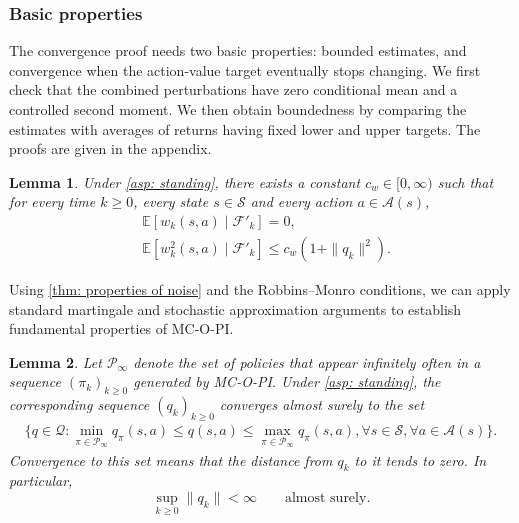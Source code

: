 \documentclass[twoside,11pt]{article}
\newtheorem{lemma}[lemma]{Lemma}
\newcommand{\qset}{\mathcal{Q}}
\newcommand{\aset}{\mathcal{A}}
\newcommand{\sset}{\mathcal{S}}
\newcommand{\polset}{\mathcal{P}}
\DeclareRobustCommand{\reviewbarstart}{%
  \ifhmode %
    \vadjust{\vbox to 0pt{%
      \vskip-\ht\strutbox %
      \vskip-\dp\strutbox %
      \cbstart[\changebarwidth] %
      \vss %
    }}%
  \else %
    \cbstart[\changebarwidth]%
  \fi %
} %
\providecommand{\DIFadd}[1]{#1} %
\providecommand{\DIFaddbegin}{\reviewbarstart} %
\providecommand{\DIFaddend}{\protect\cbend} %
\def\DIFadd#1{#1}%
\def\DIFaddbegin{}%
\def\DIFaddend{}%
\begin{document}
 \subsubsection{Basic properties}
 \DIFaddbegin \label{sec: replacement foundations}
\DIFadd{The convergence proof needs two basic properties: bounded estimates, and convergence when the action-value target eventually stops changing.
We first check that the combined perturbations have zero conditional mean and a controlled }\DIFaddend second moment. \DIFaddbegin \DIFadd{We then obtain boundedness by comparing the estimates with averages of returns having fixed lower and upper targets. The proofs are given in the appendix.
}\DIFaddend 

\begin{lemma}
\label{thm: properties of noise}
 \DIFaddbegin \DIFadd{Under \autoref{asp: standing}, there }\DIFaddend exists a constant $c_w \in [0, \infty)$
such that for every time $k \ge 0$, every state $s \in \sset$ and every action $a \in \aset(s)$,
 \DIFaddbegin \begin{align}
\DIFadd{\label{eq: muw_mds}
}&\DIFadd{\mathbb E\!\left[w_k(s,a) \mid \mathcal F'_k\right] = 0,
}\\
\DIFadd{\label{eq: muw_second_moment}
}&\DIFadd{\mathbb E\!\left[w_k^2(s,a) \mid \mathcal F'_k\right]
\le c_w(1+\|q_k\|^2) .
}\end{align}\DIFaddend 
\end{lemma}

Using \autoref{thm: properties of noise} and the Robbins--Monro conditions,
we can apply standard martingale and stochastic approximation arguments to establish fundamental properties of MC-O-PI.

 \begin{lemma}
\label{thm: bounded limit sets}
Let $\polset_\infty$ denote the set of policies that appear infinitely often in a sequence $(\pi_k)_{k \ge 0}$ generated by MC-O-PI.
 \DIFaddbegin \DIFadd{Under \autoref{asp: standing}, the }\DIFaddend corresponding sequence $(q_k)_{k \ge 0}$ converges almost surely to the set
 \DIFaddbegin \begin{align*}
    \DIFadd{\Big\{
    q \in \qset :
    \min_{\pi \in \polset_\infty} q_\pi(s,a) \leq q(s,a) \leq \max_{\pi \in \polset_\infty} q_\pi(s,a), \forall s \in \sset, \forall a \in \aset(s)
    \Big\} .
}\end{align*}\DIFaddend 
 \DIFaddbegin \DIFadd{Convergence to this set means that the distance from $q_k$ to it tends to zero. In particular,
}\[
\DIFadd{\sup_{k\ge0}\|q_k\|<\infty\qquad\text{almost surely}.
}\]\DIFaddend 
\end{lemma}
\end{document}
